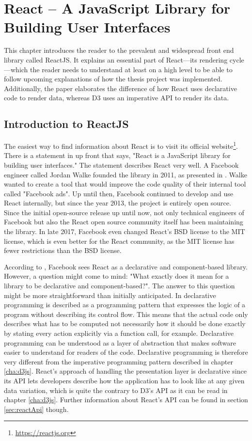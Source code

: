 \chapter{React – A JavaScript Library for Building User Interfaces}
\label{cha:react}

This chapter introduces the reader to the prevalent and widespread front end library called ReactJS. It explains an essential part of React---its rendering cycle---which the reader needs to understand at least on a high level to be able to follow upcoming explanations of how the thesis project was implemented. Additionally, the paper elaborates the difference of how React uses declarative code to render data, whereas D3 uses an imperative API to render its data.

\section{Introduction to ReactJS}
\label{sec:reactIntro}

The easiest way to find information about React is to visit its official website\footnote{\url{https://reactjs.org}}. There is a statement in \cite{React} up front that says, "React is a JavaScript library for building user interfaces." The statement describes React very well. A Facebook engineer called Jordan Walke founded the library in 2011, as presented in \cite[05:30]{ReactFoundingVideo}. Walke wanted to create a tool that would improve the code quality of their internal tool called "Facebook ads". Up until then, Facebook continued to develop and use React internally, but since the year 2013, the project is entirely open source. Since the initial open-source release up until now, not only technical engineers of Facebook but also the React open source community itself has been maintaining the library. In late 2017, Facebook even changed React's BSD license to the MIT license, which is even better for the React community, as the MIT license has fewer restrictions than the BSD license.

According to \cite{React}, Facebook sees React as a declarative and component-based library. However, a question might come to mind: "What exactly does it mean for a library to be declarative and component-based?". The answer to this question might be more straightforward than initially anticipated. In \cite{lloyd1994practical} declarative programming is described as a programming pattern that expresses the logic of a program without describing its control flow. This means that the actual code only describes what has to be computed not necessarily how it should be done exactly by stating every action explicitly via a function call, for example. Declarative programming can be understood as a layer of abstraction that makes software easier to understand for readers of the code. Declarative programming is therefore very different from the imperative programming pattern described in chapter \ref{cha:d3js}. React's approach of handling the presentation layer is declarative since its API lets developers describe how the application has to look like at any given data variation, which is quite the contrary to D3's API as it can be read in chapter \ref{cha:d3js}. Further information about React's API can be found in section \ref{sec:reactApi} though.

